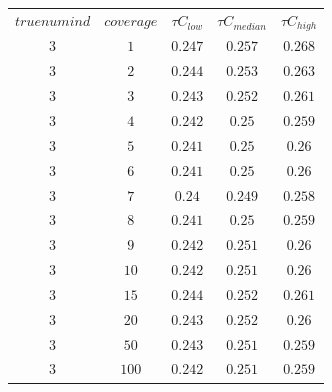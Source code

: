 \begin{table}[H]
\begin{tabular}{ccccc}
$truenumind$ & $coverage$ & ${\tau}C_{low}$ & ${\tau}C_{median}$ & ${\tau}C_{high}$\\
$3$ & $1$ & $0.247$ & $0.257$ & $0.268$\\
$3$ & $2$ & $0.244$ & $0.253$ & $0.263$\\
$3$ & $3$ & $0.243$ & $0.252$ & $0.261$\\
$3$ & $4$ & $0.242$ & $0.25$ & $0.259$\\
$3$ & $5$ & $0.241$ & $0.25$ & $0.26$\\
$3$ & $6$ & $0.241$ & $0.25$ & $0.26$\\
$3$ & $7$ & $0.24$ & $0.249$ & $0.258$\\
$3$ & $8$ & $0.241$ & $0.25$ & $0.259$\\
$3$ & $9$ & $0.242$ & $0.251$ & $0.26$\\
$3$ & $10$ & $0.242$ & $0.251$ & $0.26$\\
$3$ & $15$ & $0.244$ & $0.252$ & $0.261$\\
$3$ & $20$ & $0.243$ & $0.252$ & $0.26$\\
$3$ & $50$ & $0.243$ & $0.251$ & $0.259$\\
$3$ & $100$ & $0.242$ & $0.251$ & $0.259$\\
\end{tabular}
\end{table}
 